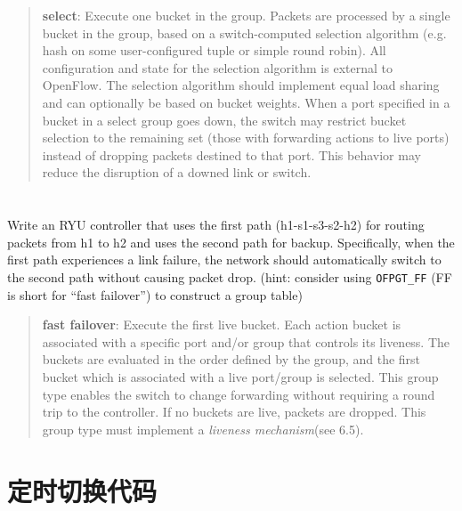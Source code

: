 \begin{quotation}
    \textbf{select}: Execute one bucket in the group. Packets are processed by a single bucket in the
group, based on a switch-computed selection algorithm (e.g. hash on some user-configured tuple or
simple round robin). All configuration and state for the selection algorithm is external to OpenFlow.
The selection algorithm should implement equal load sharing and can optionally be based on bucket
weights. When a port specified in a bucket in a select group goes down, the switch may restrict bucket
selection to the remaining set (those with forwarding actions to live ports) instead of dropping packets
destined to that port. This behavior may reduce the disruption of a downed link or switch.\cite{openflow13}
\end{quotation}



    \section{}
    Write an RYU controller that uses the first path (h1-s1-s3-s2-h2) for routing packets from h1 to h2 and uses the second path for backup. Specifically, when the first path experiences a link failure, the network should automatically switch to the second path without causing packet drop. (hint: consider using \verb"OFPGT_FF" (FF is short for ``fast failover'') to construct a group table)

    \begin{quotation}
        \textbf{fast failover}: Execute the first live bucket. Each action bucket is associated with a specific
port and/or group that controls its liveness. The buckets are evaluated in the order defined by the
group, and the first bucket which is associated with a live port/group is selected. This group type
enables the switch to change forwarding without requiring a round trip to the controller. If no buckets
are live, packets are dropped. This group type must implement a \emph{liveness mechanism}(see 6.5).\cite{openflow13}
    \end{quotation}

    

    \appendix

    \section{定时切换代码}\label{sec:per5}


